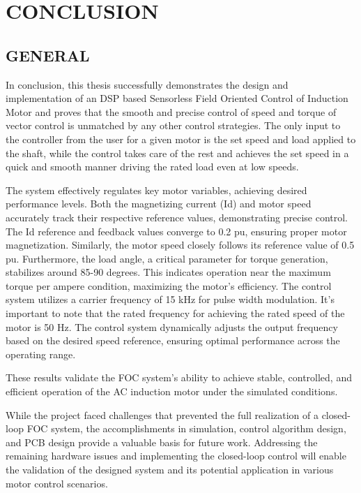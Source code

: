 \section{CONCLUSION}

\subsection{GENERAL}

In conclusion, this thesis successfully demonstrates the design and implementation of an DSP based Sensorless Field Oriented Control of Induction Motor and proves that the smooth and precise control of speed and torque of vector control is unmatched by any other control strategies. The only input to the controller from the user for a given motor is the set speed and load applied to the shaft, while the control takes care of the rest and achieves the set speed in a quick and smooth manner driving the rated load even at low speeds.

The system effectively regulates key motor variables, achieving desired performance levels. Both the magnetizing current (Id) and motor speed accurately track their respective reference values, demonstrating precise control. The Id reference and feedback values converge to 0.2 pu, ensuring proper motor magnetization. Similarly, the motor speed closely follows its reference value of 0.5 pu. Furthermore, the load angle, a critical parameter for torque generation, stabilizes around 85-90 degrees. This indicates operation near the maximum torque per ampere condition, maximizing the motor's efficiency. The control system utilizes a carrier frequency of 15 kHz for pulse width modulation.  It's important to note that the rated frequency for achieving the rated speed of the motor is 50 Hz. The control system dynamically adjusts the output frequency based on the desired speed reference, ensuring optimal performance across the operating range.


These results validate the FOC system's ability to achieve stable, controlled, and efficient operation of the AC induction motor under the simulated conditions.


While the project faced challenges that prevented the full realization of a closed-loop FOC system, the accomplishments in simulation, control algorithm design, and PCB design provide a valuable basis for future work. Addressing the remaining hardware issues and implementing the closed-loop control will enable the validation of the designed system and its potential application in various motor control scenarios.


